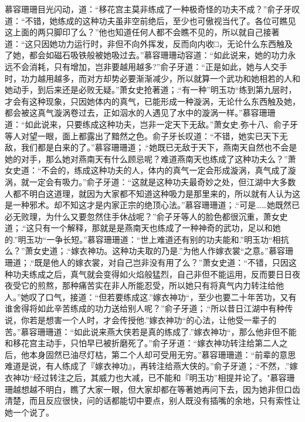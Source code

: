 \documentclass[12pt,oneside]{book}
\begin{document}
慕容珊珊目光闪动，道：``移花宫主莫非练成了一种极奇怪的功夫不成？''俞子牙叹道：``不错，她练成的这种功夫虽非空前绝后，至少也可傲视当代了。各位可瞧见这上面的两只脚印了么？''他也知道任何人都不会瞧不见的，所以就自己接著道：``这只因她功力运行时，非但不向外挥发，反而向内收□，无论什么东西触及了她，都会如磁石吸铁般被她吸过去。''慕容珊珊动容道：``如此说来，她的功力永远不会消耗，只有增加，岂非要越用越多?''俞子牙道：``正是如此，她与人交手时，功力越用越多，而对方却势必要渐渐减少，所以就算一个武功和她相若的人和她动手，到后来还是必败无疑。''萧女史抢著道；.``有一种''明玉功``练到第九层时，才会有这种现象，只因她体内的真气，已能形成一种漩涡，无论什么东西触及她，都会被这真气漩涡卷过去，正如泅水的人遇见了水中的漩涡一样。''慕容珊珊道：``如此说来，只要练成这种功夫，岂非一定天下无敌。''萧女史.弥十八、俞子牙等人对望一眼，面上都露出了黯然之色。俞子牙长叹道：``不错，她实已天下无敌，我们都是白来的了。''慕容珊珊道；.``她既已无敌于天下，燕南天自然也不会是她的对手，那么她对燕南天有什么顾忌呢？难道燕南天也练成了这种功夫么？''萧女史道：``不会的，练成这种功夫的人，体内的真气一定会形成漩涡，真气成了漩涡，就一定会有吸力。''俞子牙道：``这就是这种功夫最奇妙之处，但江湖中大多数人都不明白这道理，就因为大家都不知道这种吸力是那里来的，所以就有人认为这是一种邪术。却不知这才是内家正宗的绝顶心法。''慕容珊珊道；.``可是\ldots\ldots 她既然已必无败理，为什么又要忽然住手休战呢？''俞子牙等人的脸色都很沉重，萧女史道；.``这只有一个解释，那就是是燕南天也练成了一种神奇的武功，足以和她的.''明玉功``一争长短。''慕容珊珊道：``世上难道还有别的功夫能和.''明玉功``相抗么？''萧女史道；.``嫁衣神功。这种功夫取的乃是.''为他人作嫁衣裳``之意。''慕容珊珊道；.``既是他人的嫁衣裳，对自己岂非没有用了么？''萧女史道：``不错，只因这种功夫练成之后，真气就会变得如火焰般猛烈，自己非但不能运用，反而要日日夜夜受它的煎熬，那种痛苦实在非人所能忍受，所以她只有将真气内力转注给他人。''她叹了口气，接道：``但若要练成这.''嫁衣神功``，至少也要二十年苦功，又有谁舍得将如此辛苦练成的功力送给别人呢？''俞子牙道；.``所以昔日江湖中有种传说，你若是想害一个人时，才会传授他.''嫁衣神功``的心法，让他受一辈子的苦。''慕容珊珊道：``如此说来燕大侠若是真的练成了.''嫁衣神功``，那么他非但不能和移花宫主动手，只怕早已被折磨死了。''俞子牙道：``嫁衣神功转注给第二人之后，他本身固然已油尽灯枯，第二个人却可受用无穷。''慕容珊珊道：``前辈的意思难道是说，有人练成了『嫁衣神功』，再转注给燕大侠的。''俞子牙道；.``不然，.''嫁衣神功``经过转注之后，其威力也大减，已不能和『明玉功''相提并论了。"慕容珊珊越想越不明白，瞧了大家一眼，但大家却都在等著她再问下去，因为她非但口齿清楚，而且反应很快，问的话都能切中要点，别人既没有插嘴的余地，只有索性让她一个说了。
\end{document}
